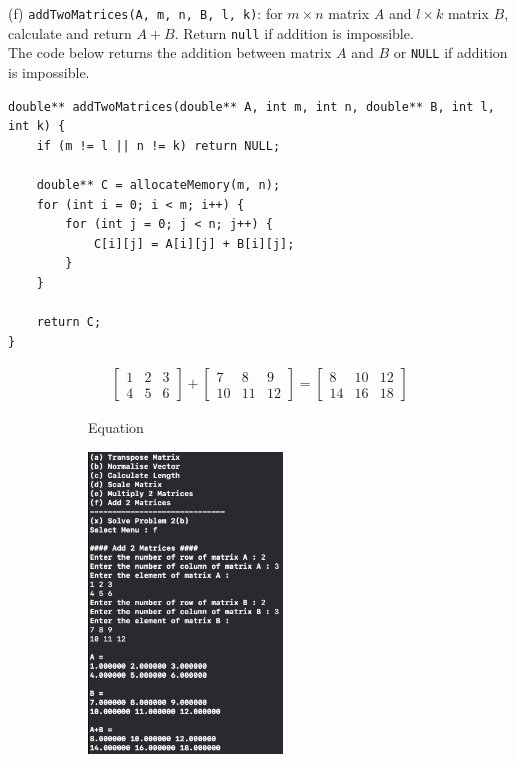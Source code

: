 (f) \texttt{addTwoMatrices(A, m, n, B, l, k)}: for $m \times n$ matrix $A$ and $l \times k$ matrix $B$, calculate and return $A + B$. Return \texttt{null} if addition is impossible.\\
The code below returns the addition between matrix $A$ and $B$ or \texttt{NULL} if addition is impossible.
\begin{verbatim}
double** addTwoMatrices(double** A, int m, int n, double** B, int l, int k) {
    if (m != l || n != k) return NULL;
    
    double** C = allocateMemory(m, n);
    for (int i = 0; i < m; i++) {
        for (int j = 0; j < n; j++) {
            C[i][j] = A[i][j] + B[i][j];
        }
    }
    
    return C;
}
\end{verbatim}
\begin{figure}[h]
    \centering
    \begin{subfigure}[b]{\textwidth}
        \centering
        \begin {align*}
        \begin{bmatrix}
            1&2&3\\4&5&6
        \end{bmatrix}+\begin{bmatrix}
            7&8&9\\10&11&12
        \end{bmatrix}
        = \begin{bmatrix}
            8&10&12\\14&16&18
        \end{bmatrix}
        \end {align*}
        \caption{Equation}
        \label{fig:equation}
    \end{subfigure}
    \hfill
    \begin{subfigure}[b]{0.45\textwidth}
        \centering
        \includegraphics[height=8cm]{img/prj0/f.png}

\end{subfigure}
\end{figure}
